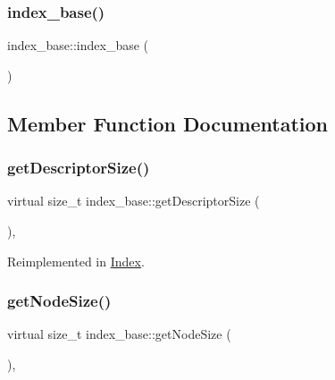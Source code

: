 \subsubsection{\texorpdfstring{index\+\_\+base()}{index\_base()}}
{\footnotesize\ttfamily index\+\_\+base\+::index\+\_\+base (\begin{DoxyParamCaption}{ }\end{DoxyParamCaption})\hspace{0.3cm}{\ttfamily [inline]}}



\subsection{Member Function Documentation}
\mbox{\label{classindex__base_a0050e83a568a2905c54c81d7515f4085}} 
\subsubsection{\texorpdfstring{get\+Descriptor\+Size()}{getDescriptorSize()}}
{\footnotesize\ttfamily virtual size\+\_\+t index\+\_\+base\+::get\+Descriptor\+Size (\begin{DoxyParamCaption}{ }\end{DoxyParamCaption})\hspace{0.3cm}{\ttfamily [inline]}, {\ttfamily [virtual]}}



Reimplemented in \hyperlink{classIndex_a0e0b37468dc2b549208da43466a68a94}{Index}.

\mbox{\label{classindex__base_ab8bfe46c64ea1ab3c596c46f0b76064e}} 
\subsubsection{\texorpdfstring{get\+Node\+Size()}{getNodeSize()}}
{\footnotesize\ttfamily virtual size\+\_\+t index\+\_\+base\+::get\+Node\+Size (\begin{DoxyParamCaption}{ }\end{DoxyParamCaption})\hspace{0.3cm}{\ttfamily [inline]}, {\ttfamily [virtual]}}



